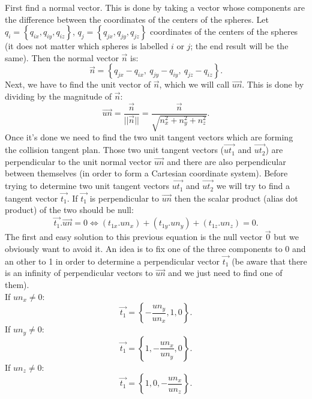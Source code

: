 First find a normal vector.
This is done by taking a vector whose components are the difference between the coordinates of the centers of the spheres. 
Let $q_i = \left\{q_{ix}, q_{iy}, q_{iz}\right\}$, $q_j = \left\{q_{jx}, q_{jy}, q_{jz}\right\}$ coordinates of the centers of the spheres (it does not matter which spheres is labelled $i$ or $j$; the end result will be the same).
Then the normal vector $\vec{n}$ is: 
\begin{equation*}	
	\vec{n} = \left\{ q_{jx} - q_{ix},~q_{jy} - q_{iy},~q_{jz} - q_{iz}  \right\}.
\end{equation*}
Next, we have to find the unit vector of $\vec{n}$, which we will call $\vec{un}$. This is done by dividing by the magnitude of $\vec{n}$:
\begin{equation*}	
	\vec{un} = \frac{\vec{n}}{||\vec{n}||} = \frac{\vec{n}}{\sqrt{n_x^2 + n_y^2 + n_z^2}}.
\end{equation*}
Once it's done we need to find the two unit tangent vectors which are forming the collision tangent plan.
Those two unit tangent vectors ($\vec{ut_1}$ and $\vec{ut_2}$) are perpendicular to the unit normal vector $\vec{un}$ and there are also perpendicular between themselves (in order to form a Cartesian coordinate system).
Before trying to determine two unit tangent vectors $\vec{ut_1}$ and $\vec{ut_2}$ we will try to find a tangent vector $\vec{t_1}$.
If $\vec{t_1}$ is perpendicular to $\vec{un}$ then the scalar product (alias dot product) of the two should be null:
\begin{equation*}
	\vec{t_1} . \vec{un} = 0 \Leftrightarrow	(t_{1x} . un_x) + (t_{1y} . un_y) + (t_{1z} . un_z) = 0.
\end{equation*}
The first and easy solution to this previous equation is the null vector $\vec{0}$ but we obviously want to avoid it.
An idea is to fix one of the three components to 0 and an other to 1 in order to determine a perpendicular vector $\vec{t_1}$ (be aware that there is an infinity of perpendicular vectors to $\vec{un}$ and we just need to find one of them).\\
If $un_x \neq 0$:
\begin{equation*}
	\vec{t_1} = \left\{ -\frac{un_y}{un_x}, 1, 0 \right\}.
\end{equation*}
If $un_y \neq 0$:
\begin{equation*}
	\vec{t_1} = \left\{ 1, -\frac{un_x}{un_y}, 0 \right\}.
\end{equation*}
If $un_z \neq 0$:
\begin{equation*}
	\vec{t_1} = \left\{ 1, 0, -\frac{un_x}{un_z} \right\}.
\end{equation*}
